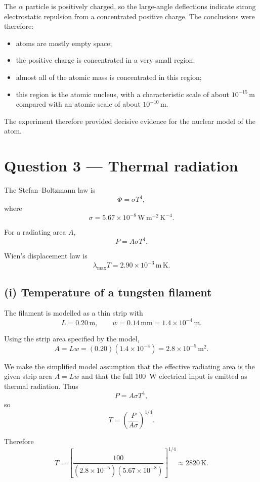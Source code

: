 \documentclass[11pt,a4paper]{article}
\begin{document}
The $\alpha$ particle is positively charged, so the large-angle deflections indicate
strong electrostatic repulsion from a concentrated positive charge. The conclusions
were therefore:

\begin{itemize}
    \item atoms are mostly empty space;
    \item the positive charge is concentrated in a very small region;
    \item almost all of the atomic mass is concentrated in this region;
    \item this region is the atomic nucleus, with a characteristic scale of about
    $10^{-15}\,\mathrm{m}$ compared with an atomic scale of about $10^{-10}\,\mathrm{m}$.
\end{itemize}

The experiment therefore provided decisive evidence for the nuclear model of the atom.

\section{Question 3 --- Thermal radiation}

The Stefan--Boltzmann law is
\[
\Phi=\sigma T^4,
\]
where
\[
\sigma=5.67\times10^{-8}\,
\mathrm{W\,m^{-2}\,K^{-4}}.
\]

For a radiating area $A$,
\[
P=A\sigma T^4.
\]

Wien's displacement law is
\[
\lambda_{\max}T=2.90\times10^{-3}\,\mathrm{m\,K}.
\]

\subsection{(i) Temperature of a tungsten filament}

The filament is modelled as a thin strip with
\[
L=0.20\,\mathrm m,\qquad
w=0.14\,\mathrm{mm}=1.4\times10^{-4}\,\mathrm m.
\]

Using the strip area specified by the model,
\[
A=Lw
=(0.20)(1.4\times10^{-4})
=2.8\times10^{-5}\,\mathrm{m^2}.
\]

We make the simplified model assumption that the effective radiating area is the given
strip area $A=Lw$ and that the full \SI{100}{W} electrical input is emitted as thermal
radiation. Thus
\[
P=A\sigma T^4,
\]
so
\[
T=
\left(\frac{P}{A\sigma}\right)^{1/4}.
\]

Therefore
\[
T=
\left[
\frac{100}
{(2.8\times10^{-5})(5.67\times10^{-8})}
\right]^{1/4}
\approx2820\,\mathrm K.
\]
\end{document}
